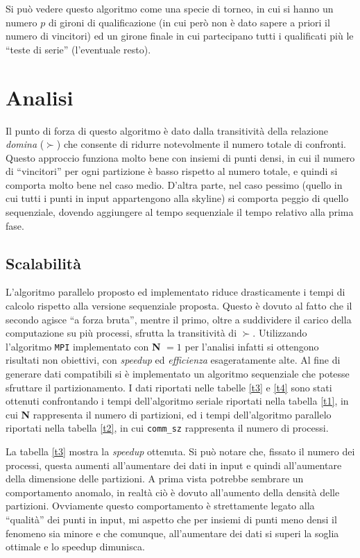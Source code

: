 \documentclass[a4paper, 11pt]{article}
\theoremstyle{definition}
\theoremstyle{remark}
\begin{document}
Si può vedere questo algoritmo come una specie di torneo, in cui si hanno un
numero $p$ di gironi di qualificazione (in cui però non è dato sapere a priori
il numero di vincitori) ed un girone finale in cui partecipano tutti i
qualificati più le ``teste di serie'' (l'eventuale resto).

\section{Analisi}
Il punto di forza di questo algoritmo è dato dalla transitività della relazione
\emph{domina} ($\succ$) che consente di ridurre notevolmente il numero totale di
confronti. Questo approccio funziona molto bene con insiemi di punti densi, in
cui il numero di ``vincitori'' per ogni partizione è basso rispetto al numero
totale, e quindi si comporta molto bene nel caso medio. D'altra parte, nel
caso pessimo (quello in cui tutti i punti in input appartengono alla skyline) si
comporta peggio di quello sequenziale, dovendo aggiungere al tempo sequenziale
il tempo relativo alla prima fase.

\subsection{Scalabilità}
L'algoritmo parallelo proposto ed implementato riduce drasticamente i tempi di
calcolo rispetto alla versione sequenziale proposta. Questo è dovuto al fatto
che il secondo agisce ``a forza bruta'', mentre il primo, oltre a suddividere
il carico della computazione su più processi, sfrutta la transitività di
$\succ$. Utilizzando l'algoritmo \texttt{MPI} implementato con \textbf{N} $= 1$
per l'analisi infatti si ottengono risultati non obiettivi, con \emph{speedup}
ed \emph{efficienza} esageratamente alte. Al fine di generare dati compatibili
si è implementato un algoritmo sequenziale che potesse sfruttare il
partizionamento.
I dati riportati nelle tabelle \ref{t3} e \ref{t4} sono stati ottenuti
confrontando i tempi dell'algoritmo seriale riportati nella tabella \ref{t1},
in cui \textbf{N} rappresenta il numero di partizioni, ed i tempi dell'algoritmo
parallelo riportati nella tabella \ref{t2}, in cui \texttt{comm\_sz} rappresenta
il numero di processi.

La tabella \ref{t3} mostra la \emph{speedup} ottenuta. Si può notare che,
fissato il numero dei processi, questa aumenti all'aumentare dei dati in input
e quindi all'aumentare della dimensione delle partizioni. A prima vista
potrebbe sembrare un comportamento anomalo, in realtà ciò è dovuto all'aumento
della densità delle partizioni. Ovviamente questo comportamento è strettamente
legato alla ``qualità'' dei punti in input, mi aspetto che per insiemi di punti
meno densi il fenomeno sia minore e che comunque, all'aumentare dei dati si
superi la soglia ottimale e lo speedup dimunisca.
\end{document}
